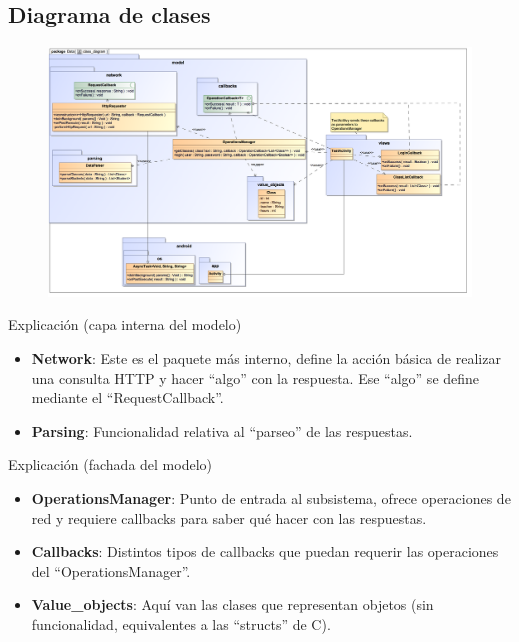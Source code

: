 \documentclass{beamer}
\begin{document}
\subsection{Diagrama de clases}
\begin{frame}
\begin{figure}
\begin{center}
\includegraphics[scale=0.33]{../observer-pattern/diagrams/class_diagram}
\end{center}
\end{figure}
\end{frame}

\begin{frame}{Explicación (capa interna del modelo)}
\begin{itemize}
\item {\bf Network}: Este es el paquete más interno, define la acción básica de realizar una consulta HTTP y hacer ``algo'' con la respuesta. Ese ``algo'' se define mediante el ``RequestCallback''.
\item {\bf Parsing}: Funcionalidad relativa al ``parseo'' de las respuestas. 
\end{itemize} 
\end{frame}

\begin{frame}{Explicación (fachada del modelo)}
\begin{itemize}
\item {\bf OperationsManager}: Punto de entrada al subsistema, ofrece operaciones de red y requiere callbacks para saber qué hacer con las respuestas.
\item {\bf Callbacks}: Distintos tipos de callbacks que puedan requerir las operaciones del ``OperationsManager''.
\item {\bf Value\_objects}: Aquí van las clases que representan objetos (sin funcionalidad, equivalentes a las ``structs'' de C).
\end{itemize} 
\end{frame}
\end{document}
